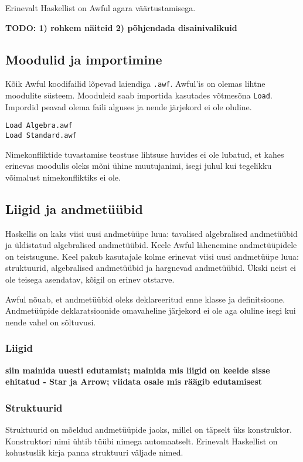 \documentclass[12pt]{article}
\newcommand\markus[1]{\textcolor{roheline}{\textbf{#1}}}
\begin{document}
    Erinevalt Haskellist on Awful agara väärtustamisega.

    \markus{TODO: 1) rohkem näiteid 2) põhjendada disainivalikuid}
    \subsection{Moodulid ja importimine}
      Kõik Awful koodifailid lõpevad laiendiga \verb!.awf!. Awful'is on olemas lihtne moodulite süsteem. Mooduleid saab importida kasutades võtmesõna \verb!Load!. Impordid peavad olema faili alguses ja nende järjekord ei ole oluline.

      \begin{verbatim}Load Algebra.awf
Load Standard.awf\end{verbatim}

      Nimekonfliktide tuvastamise teostuse lihtsuse huvides ei ole lubatud, et kahes erinevas moodulis oleks mõni ühine muutujanimi, isegi juhul kui tegelikku võimalust nimekonfliktiks ei ole.
    \subsection{Liigid ja andmetüübid}
      Haskellis on kaks viisi uusi andmetüüpe luua: tavalised algebralised andmetüübid ja üldistatud algebralised andmetüübid. Keele Awful lähenemine andmetüüpidele on teistsugune. Keel pakub kasutajale kolme erinevat viisi uusi andmetüüpe luua: struktuurid, algebralised andmetüübid ja hargnevad andmetüübid. Ükski neist ei ole teisega asendatav, kõigil on erinev otstarve.

      Awful nõuab, et andmetüübid oleks deklareeritud enne klasse ja definitsioone. Andmetüüpide deklaratsioonide omavaheline järjekord ei ole aga oluline isegi kui nende vahel on sõltuvusi.
      \subsubsection{Liigid}
        \markus{siin mainida uuesti edutamist; mainida mis liigid on keelde sisse ehitatud - Star ja Arrow; viidata osale mis räägib edutamisest}
      \subsubsection{Struktuurid}
        Struktuurid on mõeldud andmetüüpide jaoks, millel on täpselt üks konstruktor. Konstruktori nimi ühtib tüübi nimega automaatselt. Erinevalt Haskellist on kohustuslik kirja panna struktuuri väljade nimed.
\end{document}
